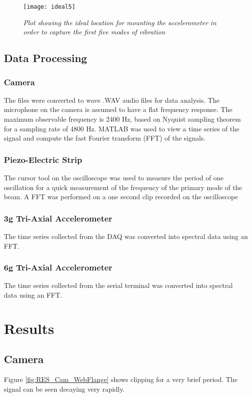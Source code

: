 \begin{figure}[h]
\centering
\texttt{[image: ideal5]}
\caption{\textit{Plot showing the ideal location for mounting the accelerometer in order to capture the first five modes of vibration}}
\label{fig:DC_AccPlacingIdeal}
\end{figure}

\section{Data Processing}
\subsection{Camera}
\indent The files were converted to wave .WAV audio files for data analysis. The microphone on the camera is assumed to have a flat frequency response. The maximum observable frequency is 2400 Hz, based on Nyquist sampling theorem for a sampling rate of 4800 Hz. MATLAB was used to view a time series of the signal and compute the fast Fourier transform (FFT) of the signals.

\subsection{Piezo-Electric Strip}
\indent The cursor tool on the oscilloscope was used to measure the period of one oscillation for a quick measurement of the frequency of the primary mode of the beam. A FFT was performed on a one second clip recorded on the oscilloscope

\subsection{3g Tri-Axial Accelerometer}
\indent The time series collected from the DAQ was converted into spectral data using an FFT.
\subsection{6g Tri-Axial Accelerometer}
\indent The time series collected from the serial terminal was converted into spectral data using an FFT.

\chapter{Results}
\section{Camera}
Figure \ref{fig:RES_Cam_WebFlange} shows clipping for a very brief period. The signal can be seen decaying very rapidly. 

